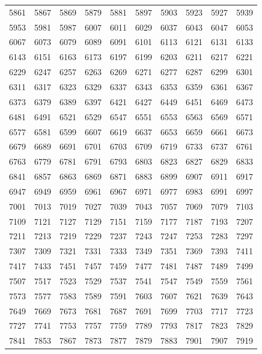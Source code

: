 \documentclass{article}
\begin{document}
\newpage


\begin{tabular}{llllllllll}
5861 & 5867 & 5869 & 5879 & 5881 & 5897 & 5903 & 5923 & 5927 & 5939 \\
5953 & 5981 & 5987 & 6007 & 6011 & 6029 & 6037 & 6043 & 6047 & 6053 \\
6067 & 6073 & 6079 & 6089 & 6091 & 6101 & 6113 & 6121 & 6131 & 6133 \\
6143 & 6151 & 6163 & 6173 & 6197 & 6199 & 6203 & 6211 & 6217 & 6221 \\
6229 & 6247 & 6257 & 6263 & 6269 & 6271 & 6277 & 6287 & 6299 & 6301 \\
6311 & 6317 & 6323 & 6329 & 6337 & 6343 & 6353 & 6359 & 6361 & 6367 \\
6373 & 6379 & 6389 & 6397 & 6421 & 6427 & 6449 & 6451 & 6469 & 6473 \\
6481 & 6491 & 6521 & 6529 & 6547 & 6551 & 6553 & 6563 & 6569 & 6571 \\
6577 & 6581 & 6599 & 6607 & 6619 & 6637 & 6653 & 6659 & 6661 & 6673 \\
6679 & 6689 & 6691 & 6701 & 6703 & 6709 & 6719 & 6733 & 6737 & 6761 \\
6763 & 6779 & 6781 & 6791 & 6793 & 6803 & 6823 & 6827 & 6829 & 6833 \\
6841 & 6857 & 6863 & 6869 & 6871 & 6883 & 6899 & 6907 & 6911 & 6917 \\
6947 & 6949 & 6959 & 6961 & 6967 & 6971 & 6977 & 6983 & 6991 & 6997 \\
7001 & 7013 & 7019 & 7027 & 7039 & 7043 & 7057 & 7069 & 7079 & 7103 \\
7109 & 7121 & 7127 & 7129 & 7151 & 7159 & 7177 & 7187 & 7193 & 7207 \\
7211 & 7213 & 7219 & 7229 & 7237 & 7243 & 7247 & 7253 & 7283 & 7297 \\
7307 & 7309 & 7321 & 7331 & 7333 & 7349 & 7351 & 7369 & 7393 & 7411 \\
7417 & 7433 & 7451 & 7457 & 7459 & 7477 & 7481 & 7487 & 7489 & 7499 \\
7507 & 7517 & 7523 & 7529 & 7537 & 7541 & 7547 & 7549 & 7559 & 7561 \\
7573 & 7577 & 7583 & 7589 & 7591 & 7603 & 7607 & 7621 & 7639 & 7643 \\
7649 & 7669 & 7673 & 7681 & 7687 & 7691 & 7699 & 7703 & 7717 & 7723 \\
7727 & 7741 & 7753 & 7757 & 7759 & 7789 & 7793 & 7817 & 7823 & 7829 \\
7841 & 7853 & 7867 & 7873 & 7877 & 7879 & 7883 & 7901 & 7907 & 7919
\end{tabular}
\end{document}

